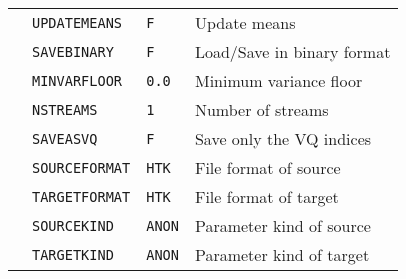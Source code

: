 \newpage







\begin{center}






\tabletail{\hline}


\begin{supertabular}{|p{1.8cm}|l|l|p{6.6cm}|}







  & \texttt{UPDATEMEANS} & \texttt{F} & Update means \\ 


 & \texttt{SAVEBINARY} & \texttt{F} & Load/Save in binary format \\ 


  & \texttt{MINVARFLOOR} & \texttt{0.0} & Minimum variance floor \\ \hline







  & \texttt{NSTREAMS} & \texttt{1} & Number of streams \\ 


  & \texttt{SAVEASVQ} & \texttt{F} & Save only the VQ indices \\ 


 & \texttt{SOURCEFORMAT} & \texttt{HTK} & File format of source \\ 


  & \texttt{TARGETFORMAT} & \texttt{HTK} & File format of target \\ 


  & \texttt{SOURCEKIND} & \texttt{ANON} & Parameter kind of source \\ 


  & \texttt{TARGETKIND} & \texttt{ANON} & Parameter kind of target \\ \hline






\end{supertabular}
\end{center}
